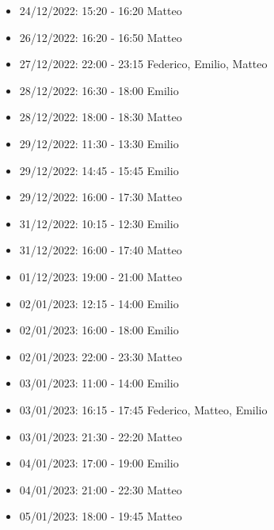 \begin{itemize}
    \item 24/12/2022: 15:20 - 16:20 Matteo
    \item 26/12/2022: 16:20 - 16:50 Matteo
    \item 27/12/2022: 22:00 - 23:15 Federico, Emilio, Matteo
    \item 28/12/2022: 16:30 - 18:00 Emilio
    \item 28/12/2022: 18:00 - 18:30 Matteo
    \item 29/12/2022: 11:30 - 13:30 Emilio
    \item 29/12/2022: 14:45 - 15:45 Emilio
    \item 29/12/2022: 16:00 - 17:30 Matteo
    \item 31/12/2022: 10:15 - 12:30 Emilio
    \item 31/12/2022: 16:00 - 17:40 Matteo
    \item 01/12/2023: 19:00 - 21:00 Matteo
    \item 02/01/2023: 12:15 - 14:00 Emilio
    \item 02/01/2023: 16:00 - 18:00 Emilio
    \item 02/01/2023: 22:00 - 23:30 Matteo
    \item 03/01/2023: 11:00 - 14:00 Emilio
    \item 03/01/2023: 16:15 - 17:45 Federico, Matteo, Emilio
    \item 03/01/2023: 21:30 - 22:20 Matteo
    \item 04/01/2023: 17:00 - 19:00 Emilio
    \item 04/01/2023: 21:00 - 22:30 Matteo
    \item 05/01/2023: 18:00 - 19:45 Matteo
\end{itemize}
\clearpage